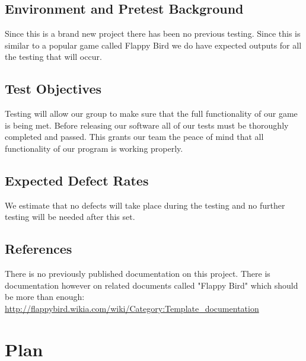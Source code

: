 \documentclass[11pt, oneside]{article}   	%
\begin{document}
\subsection{Environment and Pretest Background}
Since this is a brand new project there has been no previous testing. Since this is similar to a popular game called Flappy Bird we do have expected outputs for all the testing that will occur. 

\subsection{Test Objectives}
Testing will allow our group to make sure that the full functionality of our game is being met. Before releasing our software all of our tests must be thoroughly completed and passed. This grants our team the peace of mind that all functionality of our program is working properly.

\subsection{Expected Defect Rates}
We estimate that no defects will take place during the testing and no further testing will be needed after this set.

\subsection{References}
There is no previously published documentation on this project. There is documentation however on related documents called "Flappy Bird" which should be more than enough: \url{http://flappybird.wikia.com/wiki/Category:Template_documentation}


\section{Plan}
\end{document}
